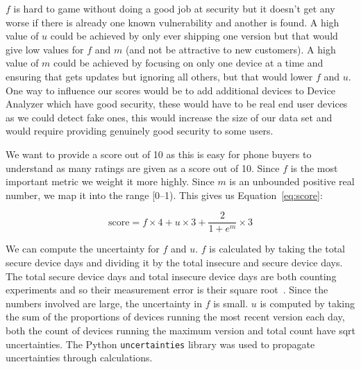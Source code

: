 $f$ is hard to game without doing a good job at security but it doesn't get any worse if there is already one known vulnerability and another is found.
A high value of $u$ could be achieved by only ever shipping one version but that would give low values for $f$ and $m$ (and not be attractive to new customers).
A high value of $m$ could be achieved by focusing on only one device at a time and ensuring that gets updates but ignoring all others, but that would lower $f$ and $u$.
One way to influence our scores would be to add additional devices to Device Analyzer which have good security, these would have to be real end user devices as we could detect fake ones, this would increase the size of our data set and would require providing genuinely good security to some users.

We want to provide a score out of 10 as this is easy for phone buyers to understand as many ratings are given as a score out of 10.
Since $f$ is the most important metric we weight it more highly.
Since $m$ is an unbounded positive real number, we map it into the range [0--1).
This gives us Equation~\ref{eq:score}:

\begin{equation}
\mathrm{score} = f\times 4 + u \times 3 + \frac{2}{1+e^m} \times 3 \label{eq:score}
\end{equation}

We can compute the uncertainty for $f$ and $u$.
$f$ is calculated by taking the total secure device days and dividing it by the total insecure and secure device days.
The total secure device days and total insecure device days are both counting experiments and so their measurement error is their square root~\cite{Taylor1997}.
Since the numbers involved are large, the uncertainty in $f$ is small.
$u$ is computed by taking the sum of the proportions of devices running the most recent version each day, both the count of devices running the maximum version and total count have sqrt uncertainties.
The Python \texttt{uncertainties} library was used to propagate uncertainties through calculations.


